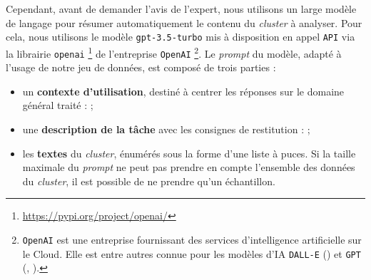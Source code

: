 			Cependant, avant de demander l'avis de l'expert, nous utilisons un large modèle de langage pour résumer automatiquement le contenu du \textit{cluster} à analyser.
			Pour cela, nous utilisons le modèle \texttt{gpt-3.5-turbo} mis à disposition en appel \texttt{API} via la librairie \texttt{openai} \footnote{
				\url{https://pypi.org/project/openai/}
			} de l'entreprise \texttt{OpenAI} \footnote{
				\texttt{OpenAI} est une entreprise fournissant des services d'intelligence artificielle sur le Cloud.
				Elle est entre autres connue pour les modèles d'IA \texttt{DALL-E} (\cite{ramesh-etal:2021:zeroshot-texttoimage-generation}) et \texttt{GPT} (\cite{brown-etal:2020:language-models-are}, \cite{openai:2023:chatgpt}).
			}.
			Le \textit{prompt} du modèle, adapté à l'usage de notre jeu de données, est composé de trois parties :
			\begin{itemize}
				\item un \textbf{contexte d'utilisation}, destiné à centrer les réponses sur le domaine général traité :  ;
				\item une \textbf{description de la tâche} avec les consignes de restitution :  ;
				\item les \textbf{textes} du \textit{cluster}, énumérés sous la forme d'une liste à puces. Si la taille maximale du \textit{prompt} ne peut pas prendre en compte l'ensemble des données du \textit{cluster}, il est possible de ne prendre qu'un échantillon.
			\end{itemize}
			
			
